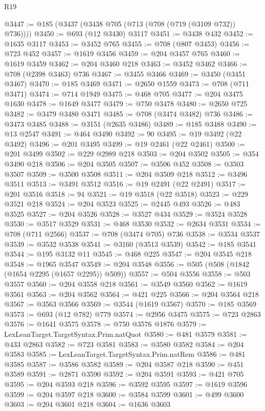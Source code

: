 \begin{lexlean}{R19}
\begin{coremodule}
{{{{{{{{{{{@3447 := @185 (@3437 (@3438 @705 (@713 (@708 (@719 (@3109 @732)) @736))))
@3450 := @693 (@12 @3430) @3117
@3451 := @3438 @432
@3452 := @1635 @3117
@3453 := @3452 @765
@3455 := @708 (@807 @3453)
@3456 := @723 @452
@3457 := @1619 @3456
@3459 := @204 @3457 @765
@3460 := @1619 @3459
@3462 := @204 @3460 @218
@3463 := @3452 @3462
@3466 := @708 (@2398 @3463) @736
@3467 := @3455 @3466
@3469 := @3450 (@3451 @3467)
@3470 := @185 @3469
@3471 := @2650 @1559
@3473 := @708 (@711 @3471)
@3474 := @714 @1949
@3475 := @468 @705
@3477 := @204 @3475 @1630
@3478 := @1649 @3477
@3479 := @750 @3478
@3480 := @2650 @725
@3482 := @3479 @3480 @3471
@3485 := @708 (@3474 @3482) @736
@3486 := @3473 @3485
@3488 := @3151 (@2635 @3486)
@3489 := @185 @3488
@3490 := @13 @2547
@3491 := @464 @3490
@3492 := 90
@3495 := @19 @3492 (@22 @3492)
@3496 := @201 @3495
@3499 := @19 @2461 (@22 @2461)
@3500 := @201 @3499
@3502 := @229 @2989 @218
@3503 := @204 @3502
@3505 := @354 @3490 @218
@3506 := @204 @3505
@3507 := @3506 @452
@3508 := @3503 @3507
@3509 := @3500 @3508
@3511 := @204 @3509 @218
@3512 := @3496 @3511
@3513 := @3491 @3512
@3516 := @19 @2491 (@22 @2491)
@3517 := @201 @3516
@3518 := 94
@3521 := @19 @3518 (@22 @3518)
@3523 := @229 @3521 @218
@3524 := @204 @3523
@3525 := @2445 @493
@3526 := @483 @3525
@3527 := @204 @3526
@3528 := @3527 @434
@3529 := @3524 @3528
@3530 := @3517 @3529
@3531 := @468 @3530
@3532 := @2634 @3531
@3534 := @708 (@711 @2566)
@3537 := @708 (@3474 @705) @736
@3538 := @3534 @3537
@3539 := @3532 @3538
@3541 := @3160 (@3513 @3539)
@3542 := @185 @3541
@3544 := @195 @3132 @11
@3545 := @468 @225
@3547 := @204 @3545 @218
@3548 := @1965 @3547
@3549 := @204 @3548
@3556 := @505 (@508 (@1842 (@1654 @2295 (@1657 @2295)) @509))
@3557 := @504 @3556
@3558 := @503 @3557
@3560 := @204 @3558 @218
@3561 := @3549 @3560
@3562 := @1619 @3561
@3563 := @204 @3562
@3564 := @421 @225
@3566 := @204 @3564 @218
@3567 := @3563 @3566
@3569 := @3544 (@1619 @3567)
@3570 := @185 @3569
@3573 := @693 (@12 @782) @779
@3574 := @2956 @3475
@3575 := @723 @2863
@3576 := @1641 @3575
@3578 := @750 @3576 @1876
@3579 := LexLeanTarget.TargetSyntax.Prim.natQuot
@3580 := @481 @3579
@3581 := @433 @2863
@3582 := @723 @3581
@3583 := @3580 @3582
@3584 := @204 @3583
@3585 := LexLeanTarget.TargetSyntax.Prim.natRem
@3586 := @481 @3585
@3587 := @3586 @3582
@3589 := @204 @3587 @218
@3590 := @451 @3589
@3591 := @2871 @3590
@3592 := @204 @3591
@3593 := @421 @705
@3595 := @204 @3593 @218
@3596 := @3592 @3595
@3597 := @1619 @3596
@3599 := @204 @3597 @218
@3600 := @3584 @3599
@3601 := @499 @3600
@3603 := @204 @3601 @218
@3604 := @1636 @3603
}}}}}}}}}}}
\end{coremodule}
\end{lexlean}
